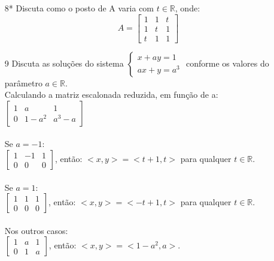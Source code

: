 \documentclass[a4paper]{article}
\begin{document}
\begin{itemize}
\item[8*] Discuta como o posto de A varia com $t\in \mathbb{R}$, onde:
$$
A=\left[\begin{array}{ccc}
1&1&t\\1&t&1\\t&1&1
\end{array}\right]
$$
\item[9] Discuta as soluções do sistema
$ \left\{
\begin{array}{ll}
\displaystyle x + ay = 1 \\
\displaystyle ax + y = a^3
\end{array}
\right.
$ conforme os valores do parâmetro $a \in \mathbb{R}.$
\\
\textcolor[rgb]{0,0,1}{Calculando a matriz escalonada reduzida, em função de a:
\\$
\left[\begin{array}{ccc}
1&a&1\\
0&1-a^2&a^3-a
\end{array}\right]
$
\\\\ Se $a=-1$:
\\$
\left[\begin{array}{ccc}
1&-1&1\\
0&0&0
\end{array}\right]
$, então: $<x,y>=<t+1,t>$ para qualquer $t\in \mathbb{R}$.
\\\\ Se $a=1$:
\\$
\left[\begin{array}{ccc}
1&1&1\\
0&0&0
\end{array}\right]
$, então: $<x,y>=<-t+1,t>$ para qualquer $t\in \mathbb{R}$.
\\\\ Nos outros casos:
\\$
\left[\begin{array}{ccc}
1&a&1\\
0&1&a
\end{array}\right]
$, então: $<x,y>=<1-a^2,a>$.
}


\end{itemize}
\end{document}

